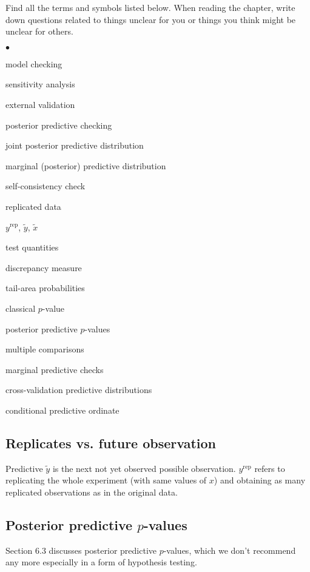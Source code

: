 \documentclass[a4paper,11pt,english]{article}
\DeclareMathOperator{\rep}{\mathrm{rep}}
\begin{document}
\noindent
Find all the terms and symbols listed below. When reading the chapter,
write down questions related to things unclear for you or things you
think might be unclear for others.
\begin{list}{$\bullet$}{\parsep=0pt\itemsep=2pt}
\item model checking
\item sensitivity analysis
\item external validation
\item posterior predictive checking
\item joint posterior predictive distribution
\item marginal (posterior) predictive distribution
\item self-consistency check
\item replicated data
\item $y^{\rep}$, $\tilde{y}$, $\tilde{x}$
\item test quantities
\item discrepancy measure
\item tail-area probabilities
\item classical $p$-value
\item posterior predictive $p$-values
\item multiple comparisons
\item marginal predictive checks
\item cross-validation predictive distributions
\item conditional predictive ordinate
\end{list}

 \subsection*{Replicates vs. future observation}

 Predictive $\tilde{y}$ is the next not yet observed possible
 observation. $y^{\mathrm{rep}}$ refers to replicating the whole
 experiment (with same values of $x$) and obtaining as many replicated
 observations as in the original data.

 \subsection*{Posterior predictive $p$-values}

 Section 6.3 discusses posterior predictive $p$-values, which we don't
 recommend any more especially in a form of hypothesis testing.
\end{document}
